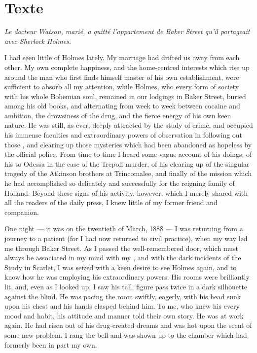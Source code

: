 \documentclass{fiche}
\begin{document}
\newpage
\section{Texte}

\noindent\small\textit{Le docteur Watson, marié, a quitté l'appartement de Baker Street qu'il
partageait avec Sherlock Holmes.}\normalsize

\begin{texte}
I had seen little of Holmes lately. My marriage had drifted us away from each other. My own
complete happiness, and the home-centred interests which rise up around the man who first
finds himself master of his own establishment, were sufficient to absorb all my attention,
while Holmes, who  every form of society
with his whole Bohemian soul, remained in our lodgings in Baker Street, buried among his old
books, and alternating from week to week between cocaine and ambition, the drowsiness of the
drug, and the fierce energy of his own keen nature. He was still, as ever, deeply attracted
by the study of crime, and occupied his immense faculties and extraordinary powers of
observation in following out those , and clearing up those
mysteries which had been abandoned as hopeless by the official police. From time to time I
heard some vague account of his doings: of his  to
Odessa in the case of the Trepoff murder, of his clearing up of the singular tragedy of the
Atkinson brothers at Trincomalee, and finally of the mission which he had accomplished so
delicately and successfully for the reigning family of Holland. Beyond these signs of his
activity, however, which I merely shared with all the readers of the daily press, I knew
little of my former friend and companion.

One night --- it was on the twentieth of March, 1888 --- I was returning from a journey to a
patient (for I had now returned to civil practice), when my way led me through Baker Street.
As I passed the well-remembered door, which must always be associated in my mind with my
, and with the dark incidents of the Study in
Scarlet, I was seized with a keen desire to see Holmes again, and to know how he was
employing his extraordinary powers. His rooms were brilliantly lit, and, even as I looked up,
I saw his tall,  figure pass twice in a dark silhouette against
the blind. He was pacing the room swiftly, eagerly, with his head sunk upon his chest and his
hands clasped behind him. To me, who knew his every mood and habit, his attitude and manner
told their own story. He was at work again. He had risen out of his drug-created dreams and
was hot upon the scent of some new problem. I rang the bell and was shown up to the chamber
which had formerly been in part my own.


\end{texte}
\end{document}
